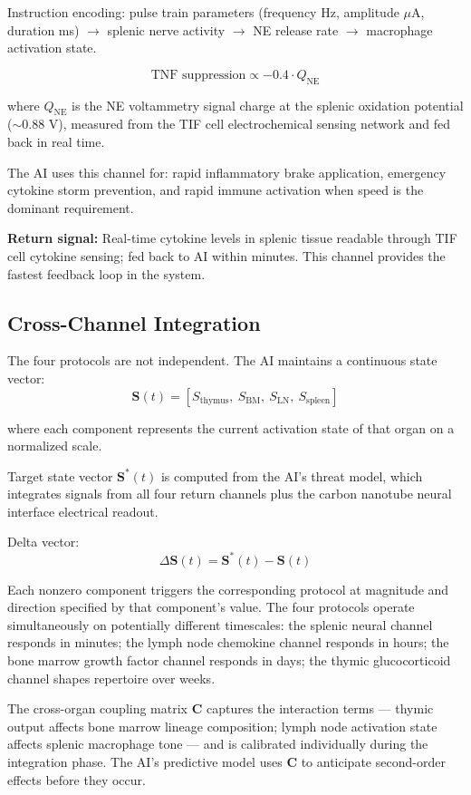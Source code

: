 \documentclass[12pt]{article}
\begin{document}
Instruction encoding: pulse train parameters (frequency Hz, amplitude $\mu$A, duration ms) $\to$ splenic nerve activity $\to$ NE release rate $\to$ macrophage activation state.

$$\text{TNF suppression} \propto -0.4 \cdot Q_{\text{NE}}$$

where $Q_{\text{NE}}$ is the NE voltammetry signal charge at the splenic oxidation potential ($\sim$0.88 V), measured from the TIF cell electrochemical sensing network and fed back in real time.

The AI uses this channel for: rapid inflammatory brake application, emergency cytokine storm prevention, and rapid immune activation when speed is the dominant requirement.

\textbf{Return signal:} Real-time cytokine levels in splenic tissue readable through TIF cell cytokine sensing; fed back to AI within minutes. This channel provides the fastest feedback loop in the system.

\subsection{Cross-Channel Integration}

The four protocols are not independent. The AI maintains a continuous state vector:
$$\mathbf{S}(t) = [S_{\text{thymus}},\ S_{\text{BM}},\ S_{\text{LN}},\ S_{\text{spleen}}]$$

where each component represents the current activation state of that organ on a normalized scale.

Target state vector $\mathbf{S}^*(t)$ is computed from the AI's threat model, which integrates signals from all four return channels plus the carbon nanotube neural interface electrical readout.

Delta vector:
$$\Delta\mathbf{S}(t) = \mathbf{S}^*(t) - \mathbf{S}(t)$$

Each nonzero component triggers the corresponding protocol at magnitude and direction specified by that component's value. The four protocols operate simultaneously on potentially different timescales: the splenic neural channel responds in minutes; the lymph node chemokine channel responds in hours; the bone marrow growth factor channel responds in days; the thymic glucocorticoid channel shapes repertoire over weeks.

The cross-organ coupling matrix $\mathbf{C}$ captures the interaction terms --- thymic output affects bone marrow lineage composition; lymph node activation state affects splenic macrophage tone --- and is calibrated individually during the integration phase. The AI's predictive model uses $\mathbf{C}$ to anticipate second-order effects before they occur.
\end{document}
